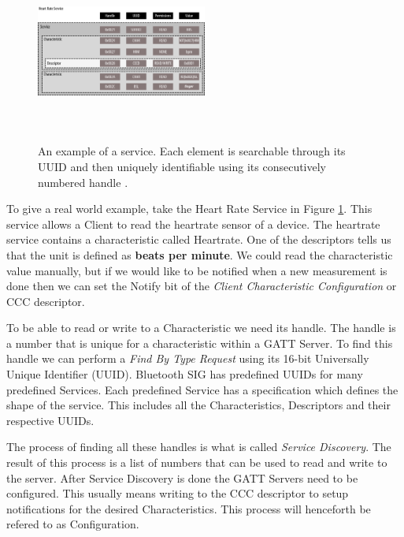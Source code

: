 \begin{figure}[]
    \centering
    \includegraphics[width=0.5\textwidth,height=6cm,keepaspectratio=true]{images/heartrate_service}
    \caption{
        An example of a service. Each element is searchable through its UUID and then uniquely identifiable using its consecutively numbered handle \cite{townsend_cufi}.
    }
    \label{fig:hrs_layout}
\end{figure}
To give a real world example, take the Heart Rate Service in Figure \ref{fig:hrs_layout}. This service allows a Client to read the heartrate sensor of a device. The heartrate service contains a characteristic called Heartrate. One of the descriptors tells us that the unit is defined as \textbf{beats per minute}. We could read the characteristic value manually, but if we would like to be notified when a new measurement is done then we can set the Notify bit of the \textit{Client Characteristic Configuration} or CCC descriptor.

To be able to read or write to a Characteristic we need its handle. The handle is a number that is unique for a characteristic within a GATT Server. To find this handle we can perform a \textit{Find By Type Request} using its 16-bit Universally Unique Identifier (UUID). Bluetooth SIG has predefined UUIDs for many predefined Services. Each predefined Service has a specification which defines the shape of the service. This includes all the Characteristics, Descriptors and their respective UUIDs.

The process of finding all these handles is what is called \textit{Service Discovery}. The result of this process is a list of numbers that can be used to read and write to the server. After Service Discovery is done the GATT Servers need to be configured. This usually means writing to the CCC descriptor to setup notifications for the desired Characteristics. This process will henceforth be refered to as Configuration. 

